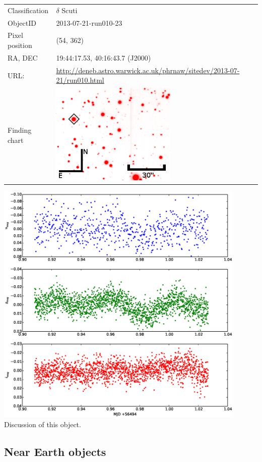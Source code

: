   \begin{tabular}{l l}
  Classification & $\delta$ Scuti \\
  ObjectID & 2013-07-21-run010-23 \\
  Pixel position & (54, 362) \\
  RA, DEC & 19:44:17.53, 40:16:43.7 (J2000) \\
  URL: & \small \url{http://deneb.astro.warwick.ac.uk/phrnaw/sitedev/2013-07-21/run010.html} \\
  Finding chart & \includegraphics[width=60mm]{images/2013-07-21-run010-23.png} \\
  \end{tabular}
  \includegraphics[width=120mm]{images/2013-07-21-run010-23_lightcurve.eps} \\
  Discussion of this object.


\subsection{Near Earth objects}

